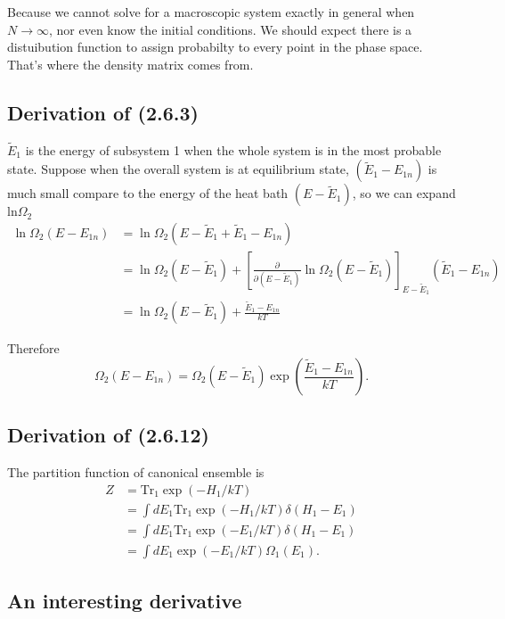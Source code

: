 \documentclass[10pt]{article}
\begin{document}
	Because we cannot solve for a macroscopic system exactly in general when $N \to \infty$, nor even know the initial conditions. We should expect there is a distuibution function to assign probabilty to every point in the phase space. That's where the density matrix comes from.

	\subsection{Derivation of (2.6.3)}


	$\tilde{E}_1$ is the energy of subsystem 1 when the whole system is in the most probable state. Suppose when the overall system is at equilibrium state, $(\tilde{E}_1 - E_{1n})$ is much small compare to the energy of the heat bath $(E - \tilde{E}_1)$, so we can expand $\mathrm{ln}\Omega_2 $
	\begin{align*}
		\ln\Omega_2(E - E_{1n}) &= \ln\Omega_2(E - \tilde{E}_1 + \tilde{E}_1 - E_{1n}) \\
		&= \ln\Omega_2(E - \tilde{E}_1) + \left[\frac{\partial }{\partial(E - \tilde{E}_1)}\ln\Omega_2(E - \tilde{E}_1)\right]_{E - \tilde{E}_1}(\tilde{E}_1 - E_{1n}) \\
		&= \ln\Omega_2(E - \tilde{E}_1) + \frac{\tilde{E}_1 - E_{1n}}{kT}
	\end{align*}

	Therefore
	\begin{equation}
		\Omega_2(E - E_{1n}) = \Omega_2(E - \tilde{E}_1) \exp\left(\frac{\tilde{E}_1 - E_{1n}}{kT}\right).
	\end{equation}

	\subsection{Derivation of (2.6.12)}

	The partition function of canonical ensemble is
	\begin{align*}
		Z &= \mathrm{Tr_1}\exp(-H_1/kT) \\
		&= \int dE_1 \mathrm{Tr_1}\exp(-H_1/kT) \delta(H_1 - E_1) \\
		&= \int dE_1 \mathrm{Tr_1}\exp(-E_1/kT) \delta(H_1 - E_1) \\
		&= \int dE_1 \exp(-E_1/kT) \Omega_1(E_1).
	\end{align*}

	\subsection{An interesting derivative}
\end{document}
